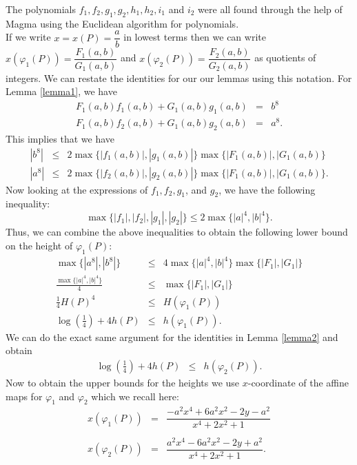 \documentclass{article}
\theoremstyle{definition}
\begin{document}
\noindent The polynomials $f_1, f_2, g_1, g_2, h_1, h_2, i_1$ and $i_2$ were all found through the help of Magma using the Euclidean algorithm for polynomials. \\
\noindent If we write $x = x(P) = \dfrac{a}{b}$ in lowest terms then we can write $x(\varphi_1(P)) = \dfrac{F_1(a,b)}{G_1(a,b)}$ and $x(\varphi_2(P)) = \dfrac{F_2(a,b)}{G_2(a,b)}$ as quotients of integers. We can restate the identities for our our lemmas using this notation. For Lemma \ref{lemma1}, we have
\begin{eqnarray*}
    F_1(a,b)f_1(a,b) + G_1(a,b)g_1(a,b) &=& b^8 \\
    F_1(a,b)f_2(a,b) + G_1(a,b)g_2(a,b) &=& a^8.
\end{eqnarray*}
This implies that we have 
\begin{eqnarray*}
    |b^8| &\leq& 2 \max \{|f_1(a,b)|, |g_1(a,b)|\} \max \{|F_1(a,b)|, |G_1(a,b)\} \\
    |a^8| &\leq& 2 \max \{|f_2(a,b)|, |g_2(a,b)|\} \max \{|F_1(a,b)|, |G_1(a,b)\}.
\end{eqnarray*}
Now looking at the expressions of $f_1, f_2, g_1$, and $g_2$, we have the following inequality:
\begin{equation*}
    \max \{|f_1|, |f_2|, |g_1|, |g_2|\} \leq 2 \max \{|a|^4, |b|^4\}.
\end{equation*}
Thus, we can combine the above inequalities to obtain the following lower bound on the height of $\varphi_1(P)$:
\begin{eqnarray*}
    \max \{ |a^8|, |b^8| \} &\leq& 4 \max \{|a|^4, |b|^4\} \max \{|F_1|, |G_1| \} \\
    \frac{\max \{|a|^4, |b|^4 \}}{4} &\leq& \max \{|F_1|, |G_1| \} \\
    \frac{1}{4} H(P)^4 &\leq& H(\varphi_1(P)) \\
    \log\left(\frac{1}{4}\right) + 4h(P) &\leq& h(\varphi_1(P)).
\end{eqnarray*}
We can do the exact same argument for the identities in Lemma \ref{lemma2} and obtain
\begin{eqnarray*}
    \log\left(\frac{1}{4}\right) + 4h(P) &\leq& h(\varphi_2(P)).
\end{eqnarray*}
\noindent Now to obtain the upper bounds for the heights we use $x$-coordinate of the affine maps for $\varphi_1$ and $\varphi_2$ which we recall here:
\begin{eqnarray*}
    x(\varphi_1(P)) &=& \dfrac{-a^2 x^4 + 6a^2 x^2 - 2y - a^2}{x^4 + 2x^2 + 1} \\ \\
    x(\varphi_2(P)) &=& \dfrac{a^2 x^4 - 6a^2 x^2 - 2y + a^2}{x^4 + 2x^2 + 1}.
\end{eqnarray*}
\end{document}
